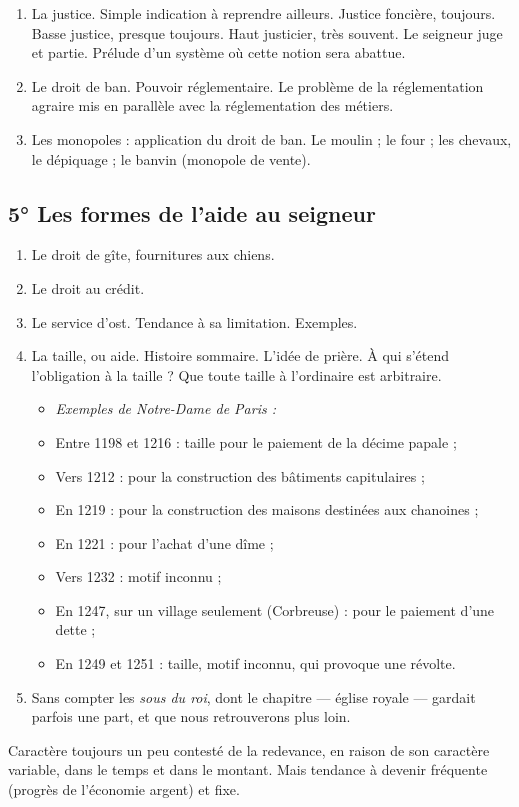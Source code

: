 \documentclass[french,twoside]{book} %
\newlength{\listmod}
\newcommand{\listhead}[1]{\hspace{-1\listmod}\emph{#1}}
\begin{document}
\begin{enumerate}[itemsep=0pt,]
\item La justice. Simple indication à reprendre ailleurs. Justice foncière, toujours. Basse justice, presque toujours. Haut justicier, très souvent. Le seigneur juge et partie. Prélude d’un système où cette notion sera abattue.
\item Le droit de ban. Pouvoir réglementaire. Le problème de la réglementation agraire mis en parallèle avec la réglementation des métiers.
\item Les monopoles : application du droit de ban. Le moulin ; le four ; les chevaux, le dépiquage ; le banvin (monopole de vente).

\end{enumerate}\subsection[5° Les formes de l’aide au seigneur]{5° Les formes de l’aide au seigneur}

\begin{enumerate}[itemsep=\baselineskip,]
\item Le droit de gîte, fournitures aux chiens.
\item Le droit au crédit.
\item Le service d’ost. Tendance à sa limitation. Exemples.
\item La taille, ou aide. Histoire sommaire. L’idée de prière. À qui s’étend l’obligation à la taille ? Que toute taille à l’ordinaire est arbitraire.\par

\begin{itemize}[itemsep=0pt,]
\item[]\listhead{Exemples de Notre-Dame de Paris :}
\item Entre 1198 et 1216 : taille pour le paiement de la décime papale ;
\item Vers 1212 : pour la construction des bâtiments capitulaires ;
\item En 1219 : pour la construction des maisons destinées aux chanoines ;
\item En 1221 : pour l’achat d’une dîme ;
\item Vers 1232 : motif inconnu ;
\item En 1247, sur un village seulement (Corbreuse) : pour le paiement d’une dette ;
\item En 1249 et 1251 : taille, motif inconnu, qui provoque une révolte.
\end{itemize}

\item Sans compter les \emph{sous du roi}, dont le chapitre — église royale — gardait parfois une part, et que nous retrouverons plus loin.

\end{enumerate}\noindent Caractère toujours un peu contesté de la redevance, en raison de son caractère variable, dans le temps et dans le montant. Mais tendance à devenir fréquente (progrès de l’économie argent) et fixe.\par
\end{document}
